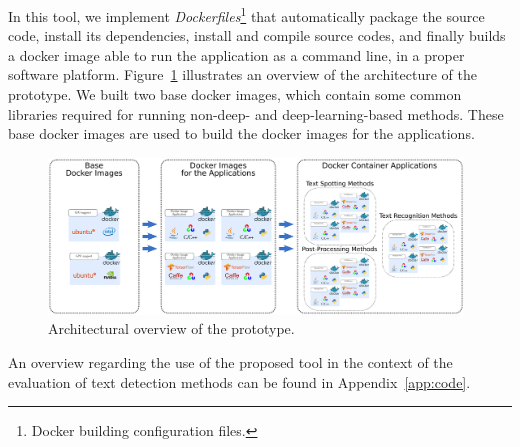 In this tool, we implement \textit{Dockerfiles}\footnote{Docker building configuration files.} that automatically package the source code, install its dependencies, install and compile source codes, and finally builds a docker image able to run the application as a command line, in a proper software platform. Figure~\ref{fig:overview-prototype} illustrates an overview of the architecture of the prototype. We built two base docker images, which contain some common libraries required for running non-deep- and deep-learning-based methods. These base docker images are used to build the docker images for the applications.
%
\begin{figure}[h!]
  \centering
  \includegraphics[width=0.98\textwidth]{E4/version-2/figs/prototype-overview.pdf}
  \caption{Architectural overview of the prototype.}
  \label{fig:overview-prototype}
\end{figure}

An overview regarding the use of the proposed tool in the context of the evaluation of text detection methods can be found in Appendix~\ref{app:code}.




